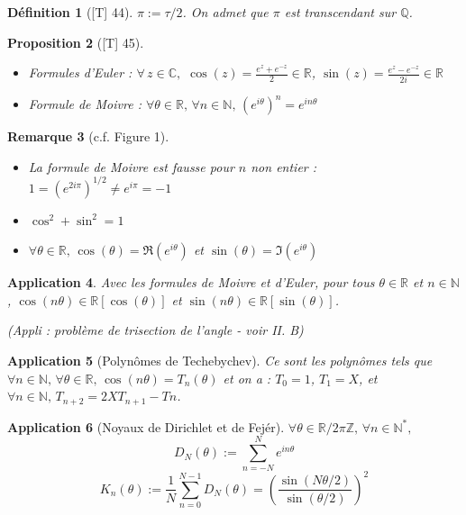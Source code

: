 \documentclass[10pt, a4paper, parskip=full, twoside, twocolumn]{report}
\newtheorem{definition}{Définition}
\newtheorem{proposition}[definition]{Proposition}
\newtheorem{remark}[definition]{Remarque}
\newtheorem{application}[definition]{Application}
\newcommand{\IN}{\mathbb{N}}
\newcommand{\IZ}{\mathbb{Z}}
\newcommand{\IQ}{\mathbb{Q}}
\newcommand{\IC}{\mathbb{C}}
\newcommand{\IR}{\mathbb{R}}
\begin{document}
\begin{definition}[\textnormal{[T] 44}]
	$\pi := \tau/2$. On admet que $\pi$ est transcendant sur $\IQ$.
\end{definition}

\begin{proposition}[\textnormal{[T] 45}]
	\begin{itemize}
		\item Formules d'Euler : $\forall\,z\in\IC,$ $\cos(z)=\frac{e^z +e^{-z}}{2}\in\IR$, $\sin(z)=\frac{e^z -e^{-z}}{2i}\in\IR$
		\item Formule de Moivre : $\forall \theta \in\IR,\,\forall n\in\IN,\, \left(e^{i\theta}\right)^n = e^{in\theta}$
	\end{itemize}
\end{proposition}

\begin{remark}[c.f. Figure 1]
	\begin{itemize}
		\item[$\vartriangleright$] La formule de Moivre est fausse pour $n$ non entier : 
	$1 = \left(e^{2i\pi}\right)^{1/2} \neq e^{i\pi} = -1$
		\item[$\vartriangleright$] $\cos^2 + \sin^2 = 1$
		\item[$\vartriangleright$] $\forall \theta\in\IR,\,\cos(\theta) = \Re(e^{i\theta})$ et $\sin(\theta) = \Im(e^{i\theta})$
	\end{itemize}
\end{remark}

\begin{application}
	Avec les formules de Moivre et d'Euler, pour tous $\theta\in\IR$ et $n\in\IN$, $\cos(n\theta)\in \IR[\cos(\theta)]$ et $\sin(n\theta)\in\IR[\sin(\theta)]$.

	(Appli : problème de trisection de l'angle - voir II. B)
\end{application}

\begin{application}[Polynômes de Techebychev]
	Ce sont les polynômes tels que $\forall n\in\IN,\, \forall\theta\in\IR,\, \cos(n\theta) = T_n(\theta)$
	et on a : $T_0 = 1$, $T_1 = X$, et $\forall n\in\IN,\, T_{n+2}=2XT_{n+1} - Tn$.
\end{application}

\begin{application}[Noyaux de Dirichlet et de Fejér]
	$\forall \theta \in\IR/2\pi\IZ,\, \forall n\in\IN^*,$
	$$D_N(\theta) := \sum_{n=-N}^{N} e^{in\theta}$$
	$$K_n(\theta) := \frac{1}{N}\sum_{n=0}^{N-1} D_N(\theta) = \left(\frac{\sin(N\theta/2)}{\sin(\theta/2)}\right)^2$$
\end{application}
\end{document}
